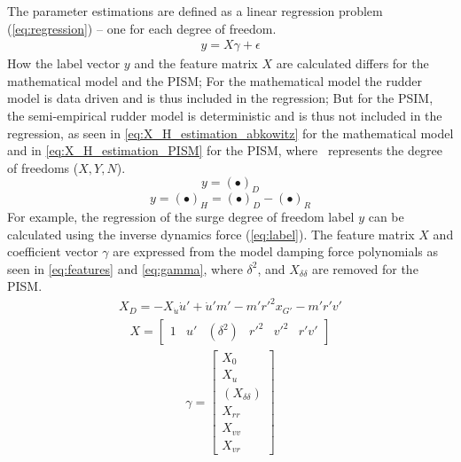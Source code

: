The parameter estimations are defined as a linear regression problem (\autoref{eq:regression}) -- one for each degree of freedom. 
\begin{equation}\label{eq:regression}
\begin{split}y = X\gamma + \epsilon\end{split}
\end{equation}
How the label vector \(y\) and the feature matrix \(X\) are calculated differs for the mathematical model and the PISM; For the mathematical model the rudder model is data driven and is thus included in the regression; But for the PSIM, the semi-empirical rudder model is deterministic and is thus not included in the regression, as seen in \autoref{eq:X_H_estimation_abkowitz} for the mathematical model and in \autoref{eq:X_H_estimation_PISM} for the PISM, where \textbullet\ represents the degree of freedoms ($X,Y,N$).
\begin{equation}
    \label{eq:X_H_estimation_abkowitz}
    y = (\bullet)_D
\end{equation}
\begin{equation}
    \label{eq:X_H_estimation_PISM}
    y = (\bullet)_H = (\bullet)_D - (\bullet)_R
\end{equation}
For example, the regression of the surge degree of freedom label \(y\) can be calculated using the inverse dynamics force (\autoref{eq:label}). 
The feature matrix \(X\) and coefficient vector $\gamma$ are expressed from the model damping force polynomials as seen in \autoref{eq:features} and \autoref{eq:gamma}, where $\delta^2$, and $X_{\delta\delta}$ are removed for the PISM.
\begin{equation}\label{eq:label}
\begin{split}\displaystyle X_D = - X_{\dot{u}} \dot{u}' + \dot{u}' m' - m' r'^{2} x_{G'} - m' r' v'\end{split}
\end{equation}
\begin{equation}\label{eq:features}
\begin{split}\displaystyle X = \left[\begin{matrix}1 & u' & (\delta^{2}) & r'^{2} & v'^{2} & r' v'\end{matrix}\right]\end{split}
\end{equation}
\begin{equation}\label{eq:gamma}
\begin{split}\displaystyle \gamma = \left[\begin{matrix}X_{0}\\X_{u}\\(X_{\delta\delta})\\X_{rr}\\X_{vv}\\X_{vr}\end{matrix}\right]\end{split}
\end{equation}

